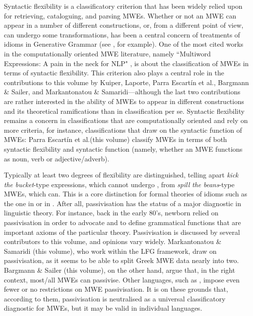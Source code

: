 \documentclass[output=paper]{langsci/langscibook}
\begin{document}
Syntactic flexibility  is a classificatory criterion that has been widely relied upon for retrieving, cataloguing, and parsing MWEs. Whether or not an MWE can appear in a number of different constructions, or, from a different point of view, can undergo some transformations, has been a central concern of treatments of idioms in Generative Grammar (see \citealt{Fraser1970}, for example). One of the most cited works in the computationally oriented MWE literature, namely ``Multiword Expressions: A pain in the neck for NLP" \citep{Sag:2002}, is about the classification of MWEs in terms of syntactic flexibility. This criterion also plays a central role in the contributions to this volume by Kuiper, Laporte, Parra Escart{í}n et al., Bargmann \& Sailer, and Markantonatou \& Samaridi---although the last two contributions are rather interested in the ability of MWEs to appear in different constructions and its theoretical ramifications than in classification per se. Syntactic flexibility remains a concern in classifications that are computationally oriented and rely on more criteria, for instance, classifications that draw on the syntactic function of MWEs: Parra Escart\'in et al.\@ (this volume) classify MWEs in terms of both syntactic flexibility and syntactic function (namely, whether an MWE functions as  noun, verb or adjective/adverb). 

Typically at least two degrees of flexibility are distinguished, 
telling apart \textit{kick the bucket}-type expressions, which cannot undergo , from \textit{spill the beans}-type MWEs, which can. This is a core distinction for formal theories of idioms such as the one in   \citep{GKPS} or in \citet{Nunberg1994}. After all, passivisation has the status of a major diagnostic in linguistic theory. For instance, back in the early 80's, newborn  relied on passivisation in order to advocate  and to define grammatical functions that are important axioms of the particular theory. Passivisation is discussed by several contributors to this volume, and opinions vary widely.  Markantonatou \& Samaridi (this volume), who work within the LFG framework, draw on passivisation, as it seems to be able to split Greek MWE data nearly into two.  Bargmann \& Sailer (this volume), on the other hand,
argue that, in the right context, most/all  MWEs can passivise. Other languages, such as , impose even fewer or no restrictions on MWE passivisation. It is on these grounds that, according to them, passivisation is neutralised as a universal classificatory diagnostic for MWEs, but it may be valid in individual languages.
\end{document}
